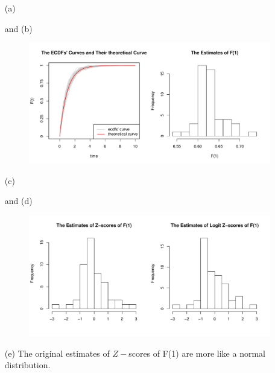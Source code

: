 \documentclass[paper=a4, fontsize=12pt]{scrartcl} %
\numberwithin{equation}{section} %
\numberwithin{figure}{section} %
\numberwithin{table}{section} %
\begin{document}
\begin{itemize}
 	\item[(a)]{and (b)
		\begin{figure}[h]
			\includegraphics[width = 6 in]{3_10_ab.pdf}
		\end{figure}	
	}
	
 	\item[(c)]{and (d)
		\begin{figure}[h]
			\includegraphics[width = 6 in]{3_10_cd.pdf}
		\end{figure}		
	}
 	\item[(e)]{
		The original estimates of  $Z-$scores of F(1) are more like a normal distribution. 
	}
\end{itemize}
\end{document}
